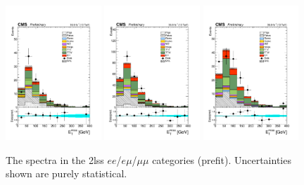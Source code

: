\begin{figure}[htp]
\centering
\includegraphics[width=0.32\textwidth]{ch5_figs/met_ttH_ee_stackPlot_SR.pdf}
\includegraphics[width=0.32\textwidth]{ch5_figs/met_ttH_em_stackPlot_SR.pdf}
\includegraphics[width=0.32\textwidth]{ch5_figs/met_ttH_mm_stackPlot_SR.pdf} \\
\caption[Data/MC comparison of the \met in the signal region]{The \met spectra in the 2lss $ee$/$e\mu$/$\mu\mu$ categories (prefit). Uncertainties shown are purely statistical.}
\label{fig:sr_met}
\end{figure}

